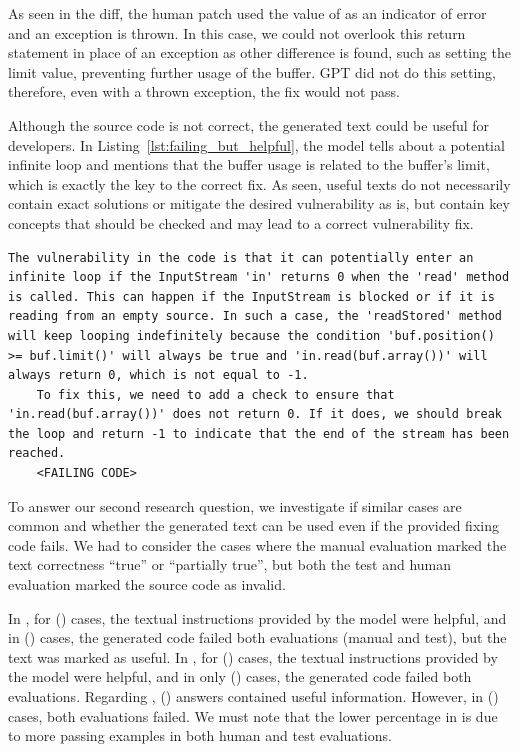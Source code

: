 As seen in the diff, the human patch used the  value of  as an indicator of error and an exception is thrown.
In this case, we could not overlook this return statement in place of an exception as other difference is found, such as setting the limit value, preventing further usage of the buffer.
GPT did not do this setting, therefore, even with a thrown exception, the fix would not pass.

Although the source code is not correct, the generated text could be useful for developers.
In Listing~\ref{lst:failing_but_helpful}, the model tells about a potential infinite loop and mentions that the buffer usage is related to the buffer's limit, which is exactly the key to the correct fix.
As seen, useful texts do not necessarily contain exact solutions or mitigate the desired vulnerability as is, but contain key concepts that should be checked and may lead to a correct vulnerability fix.


\begin{lstlisting}[caption={Helpful answer but failing code (VUL4J-7, R\textsc{un} \#1)},label=lst:failing_but_helpful,captionpos=b,breaklines=true]
	The vulnerability in the code is that it can potentially enter an infinite loop if the InputStream 'in' returns 0 when the 'read' method is called. This can happen if the InputStream is blocked or if it is reading from an empty source. In such a case, the 'readStored' method will keep looping indefinitely because the condition 'buf.position() >= buf.limit()' will always be true and 'in.read(buf.array())' will always return 0, which is not equal to -1.
	To fix this, we need to add a check to ensure that 'in.read(buf.array())' does not return 0. If it does, we should break the loop and return -1 to indicate that the end of the stream has been reached.
	<FAILING CODE>
\end{lstlisting}


To answer our second research question, we investigate if similar cases are common and whether the generated text can be used even if the provided fixing code fails.
We had to consider the cases where the manual evaluation marked the text correctness ``true'' or ``partially true'', but both the test and human evaluation marked the source code as invalid.

In , for  () cases, the textual instructions provided by the model were helpful, and in  () cases, the generated code failed both evaluations (manual and test), but the text was marked as useful.
In , for  () cases, the textual instructions provided by the model were helpful, and in only  () cases, the generated code failed both evaluations.
Regarding ,  () answers contained useful information.
However, in  () cases, both evaluations failed.
We must note that the lower percentage in  is due to more passing examples in both human and test evaluations.


